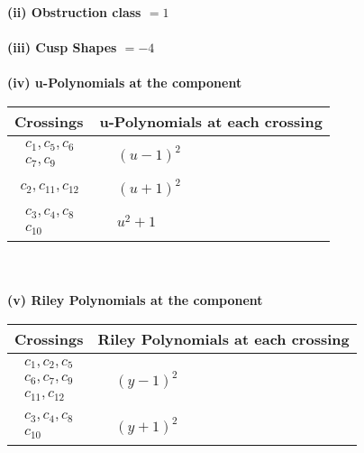 \documentclass[1p]{elsarticle_modified}
\theoremstyle{definition}
\begin{document}
\flushleft \textbf{(ii) Obstruction class $= 1$}\\~\\
\flushleft \textbf{(iii) Cusp Shapes $= -4$}\\~\\
\newpage\renewcommand{\arraystretch}{1}
\flushleft \textbf{(iv) u-Polynomials at the component}\newline \\
\begin{tabular}{m{50pt}|m{274pt}}
Crossings & \hspace{64pt}u-Polynomials at each crossing \\
\hline $$\begin{aligned}c_{1},c_{5},c_{6}\\c_{7},c_{9}\end{aligned}$$&$\begin{aligned}
&(u-1)^2
\end{aligned}$\\
\hline $$\begin{aligned}c_{2},c_{11},c_{12}\end{aligned}$$&$\begin{aligned}
&(u+1)^2
\end{aligned}$\\
\hline $$\begin{aligned}c_{3},c_{4},c_{8}\\c_{10}\end{aligned}$$&$\begin{aligned}
&u^2+1
\end{aligned}$\\
\hline
\end{tabular}\\~\\
\newpage\renewcommand{\arraystretch}{1}
\flushleft \textbf{(v) Riley Polynomials at the component}\newline \\
\begin{tabular}{m{50pt}|m{274pt}}
Crossings & \hspace{64pt}Riley Polynomials at each crossing \\
\hline $$\begin{aligned}c_{1},c_{2},c_{5}\\c_{6},c_{7},c_{9}\\c_{11},c_{12}\end{aligned}$$&$\begin{aligned}
&(y-1)^2
\end{aligned}$\\
\hline $$\begin{aligned}c_{3},c_{4},c_{8}\\c_{10}\end{aligned}$$&$\begin{aligned}
&(y+1)^2
\end{aligned}$\\
\hline
\end{tabular}\\~\\
\end{document}
